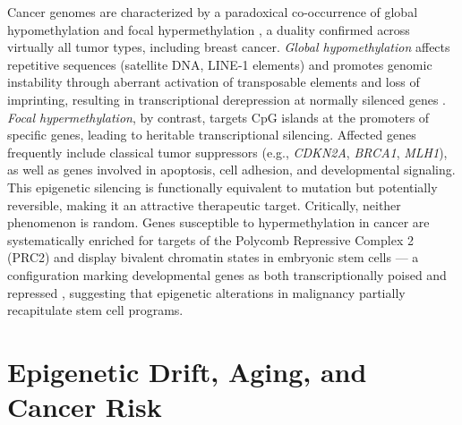 Cancer genomes are characterized by a paradoxical co-occurrence of global
hypomethylation and focal hypermethylation \cite{ehrlich2002}, a duality
confirmed across virtually all tumor types, including breast cancer.
\emph{Global hypomethylation} affects repetitive sequences (satellite DNA,
LINE-1 elements) and promotes genomic instability through aberrant activation
of transposable elements and loss of imprinting, resulting in transcriptional
derepression at normally silenced genes \cite{ehrlich2002}.
\emph{Focal hypermethylation}, by contrast, targets CpG islands at the promoters
of specific genes, leading to heritable transcriptional silencing. Affected genes
frequently include classical tumor suppressors (e.g., \textit{CDKN2A},
\textit{BRCA1}, \textit{MLH1}), as well as genes involved in apoptosis, cell
adhesion, and developmental signaling. This epigenetic silencing is functionally
equivalent to mutation but potentially reversible, making it an attractive
therapeutic target.
Critically, neither phenomenon is random. Genes susceptible to hypermethylation
in cancer are systematically enriched for targets of the Polycomb Repressive
Complex 2 (PRC2) and display bivalent chromatin states in embryonic stem cells ---
a configuration marking developmental genes as both transcriptionally poised and
repressed \cite{Teschendorff2010}, suggesting that epigenetic alterations
in malignancy partially recapitulate stem cell programs.
\section{Epigenetic Drift, Aging, and Cancer Risk}

